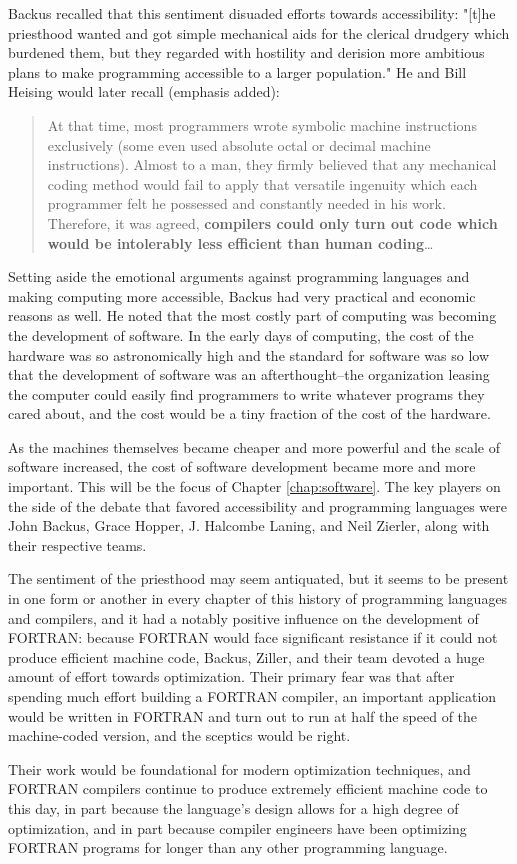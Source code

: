Backus recalled that this sentiment disuaded efforts towards accessibility:
"[t]he priesthood wanted and got simple mechanical aids for the clerical
drudgery which burdened them, but they regarded with hostility and derision
more ambitious plans to make programming accessible to a larger population."
He and Bill Heising would later recall (emphasis added):

\begin{quotation}
	At that time, most programmers wrote symbolic machine instructions exclusively
	(some even used absolute octal or decimal machine instructions).
	Almost to a man, they firmly believed that any mechanical coding method
	would fail to apply that versatile ingenuity which each programmer felt he
	possessed and constantly needed in his work.
	Therefore, it was agreed, \textbf{compilers could only turn out code which would be
		intolerably less efficient than human coding}\dots
\end{quotation}

Setting aside the emotional arguments against programming languages and making
computing more accessible, Backus had very practical and economic reasons as well.
He noted that the most costly part of computing was becoming the development of
software. In the early days of computing, the cost of the hardware was so
astronomically high and the standard for software was so low that the development of software
was an afterthought--the organization leasing the computer could easily find
programmers to write whatever programs they cared about, and the cost would be
a tiny fraction of the cost of the hardware.

As the machines themselves became cheaper and more powerful and the scale of software
increased, the cost of software development became more and more important.
This will be the focus of Chapter \ref{chap:software}.
The key players on the side of the debate that favored accessibility and
programming languages were John Backus, Grace Hopper, J. Halcombe Laning,
and Neil Zierler, along with their respective teams.

The sentiment of the priesthood may seem antiquated, but it seems to be
present in one form or another in every chapter of this history of programming languages
and compilers, and it had a notably positive influence on the development of FORTRAN:
because FORTRAN would face significant resistance if it could not produce
efficient machine code, Backus, Ziller, and their team devoted a huge amount of
effort towards optimization.
Their primary fear was that after spending much effort building a FORTRAN
compiler, an important application would be written in FORTRAN and turn
out to run at half the speed of the machine-coded version, and the
sceptics would be right\cite{backus_heising_fortran_1964}.

Their work would be foundational for modern optimization techniques, and
FORTRAN compilers continue to produce extremely efficient machine code to
this day, in part because the language's design allows for a high degree of
optimization, and in part because compiler engineers have been optimizing
FORTRAN programs for longer than any other programming language.

